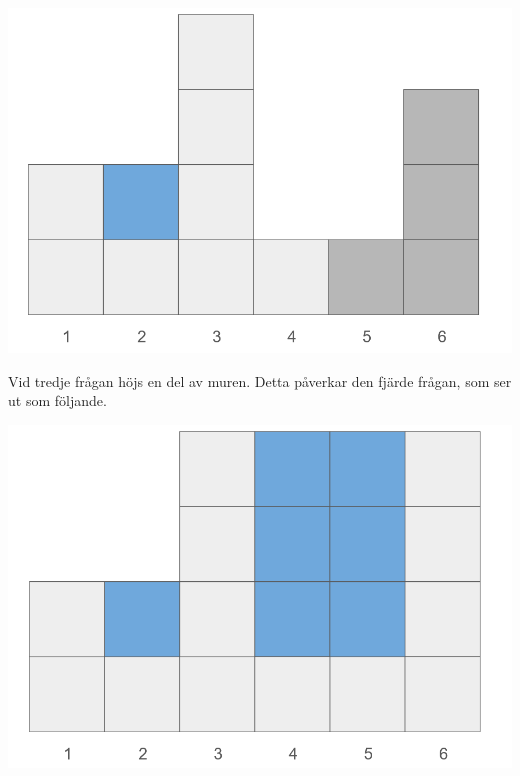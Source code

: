 \begin{center}
  \includegraphics[scale=0.2]{mur3.png}
\end{center}

Vid tredje frågan höjs en del av muren. Detta påverkar den fjärde frågan, som ser ut som följande.

\begin{center}
  \includegraphics[scale=0.2]{mur4.png}
\end{center}
